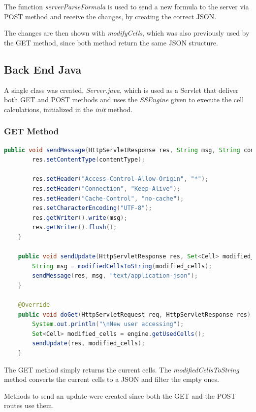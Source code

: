 \documentclass[12pt, a4paper]{article}
\begin{document}
  The function \textit{serverParseFormula} is used to send a new formula to the server via POST method and receive the changes, by creating the correct JSON. 

  The changes are then shown with \textit{modifyCells}, which was also previously used by the GET method, since both method return the same JSON structure.

  \subsection{Back End Java}
  A single class was created, \textit{Server.java}, which is used as a Servlet that deliver both GET and POST methods and uses the \textit{SSEngine} given to execute the cell calculations, initialized in the \textit{init} method.

  \subsubsection{GET Method}
  \begin{lstlisting}[language=java, caption={GET route}]
    public void sendMessage(HttpServletResponse res, String msg, String contentType) throws IOException {
        res.setContentType(contentType);

        res.setHeader("Access-Control-Allow-Origin", "*");
        res.setHeader("Connection", "Keep-Alive");
        res.setHeader("Cache-Control", "no-cache");
        res.setCharacterEncoding("UTF-8");
        res.getWriter().write(msg);
        res.getWriter().flush();
    }
    
    public void sendUpdate(HttpServletResponse res, Set<Cell> modified_cells) throws IOException {
        String msg = modifiedCellsToString(modified_cells);
        sendMessage(res, msg, "text/application-json");
    }
    
    @Override
    public void doGet(HttpServletRequest req, HttpServletResponse res) throws IOException {
        System.out.println("\nNew user accessing");
        Set<Cell> modified_cells = engine.getUsedCells();
        sendUpdate(res, modified_cells);
    }
  \end{lstlisting}

  The GET method simply returns the current cells. The \textit{modifiedCellsToString} method converts the current cells to a JSON and filter the empty ones.

  Methods to send an update were created since both the GET and the POST routes use them.
\end{document}
